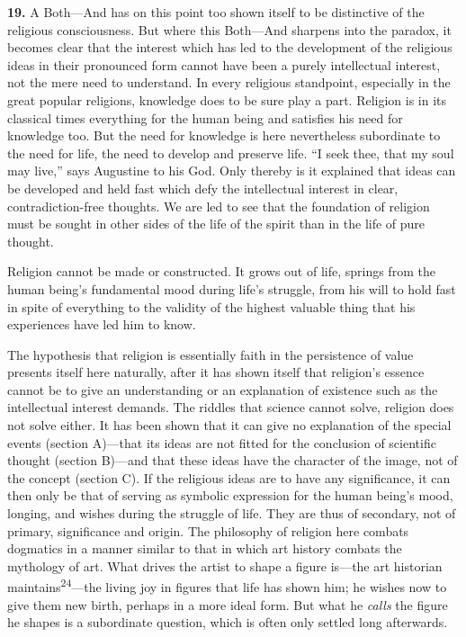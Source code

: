 \documentclass[12pt,a4paper]{book}
\newcommand{\opage}[1]{\marginnote{\footnotesize\textit{[#1]}}}
\begin{document}
\noindent\textbf{19.} A Both---And has on this point too shown itself to be
distinctive of the religious consciousness. But where this Both---And sharpens
into the paradox, it becomes clear that the interest which has led to the
development of the religious ideas in their pronounced form cannot have been a
purely intellectual interest, not the mere need to understand. In every
religious standpoint, especially in the great popular religions, knowledge
does to be sure play a part. Religion is in its classical times everything for
the human being and satisfies his need for knowledge too. But the need for
knowledge is here nevertheless subordinate to the need for life, the need to
develop and preserve life. ``I seek thee, 
\opage{49}that my soul may live,'' says
Augustine to his God. Only thereby is it explained that ideas can be developed
and held fast which defy the intellectual interest in clear,
contradiction-free thoughts. We are led to see that the foundation of religion
must be sought in other sides of the life of the spirit than in the life of
pure thought.

Religion cannot be made or constructed. It grows out of life, springs from the
human being's fundamental mood during life's struggle, from his will to hold
fast in spite of everything to the validity of the highest valuable thing that
his experiences have led him to know.

The hypothesis that religion is essentially faith in the persistence of value
presents itself here naturally, after it has shown itself that religion's
essence cannot be to give an understanding or an explanation of existence such
as the intellectual interest demands. The riddles that science cannot solve,
religion does not solve either. It has been shown that it can give no
explanation of the special events (section A)---that its ideas are not fitted
for the conclusion of scientific thought (section B)---and that these ideas
have the character of the image, not of the concept (section C). If the
religious ideas are to have any significance, it can then only be that of
serving as symbolic expression for the human being's mood, longing, and wishes
during the struggle of life. They are thus of secondary, not of primary,
significance and origin. The philosophy of religion here combats dogmatics in
a manner similar to that in which art history combats the mythology of art.
What drives the artist to shape a figure is---the art historian
maintains\textsuperscript{24}---the living joy in figures that life has shown
him; he wishes now to give them new birth, perhaps in a more ideal form. But
what he \emph{calls} the figure he shapes is a subordinate question, which is
often only settled long afterwards.
\end{document}

